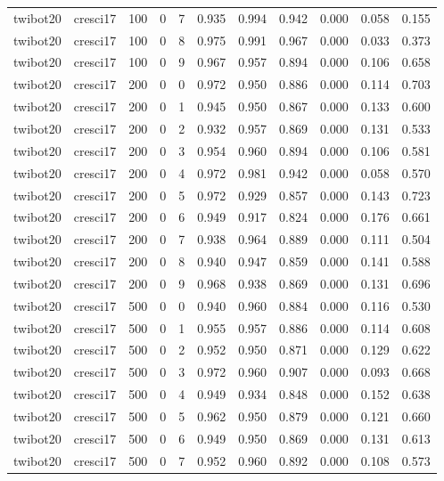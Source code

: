 \begin{tabular}{llrrrrrrrrr}
twibot20 & cresci17 & 100 & 0 & 7 & 0.935 & 0.994 & 0.942 & 0.000 & 0.058 & 0.155 \\
twibot20 & cresci17 & 100 & 0 & 8 & 0.975 & 0.991 & 0.967 & 0.000 & 0.033 & 0.373 \\
twibot20 & cresci17 & 100 & 0 & 9 & 0.967 & 0.957 & 0.894 & 0.000 & 0.106 & 0.658 \\
twibot20 & cresci17 & 200 & 0 & 0 & 0.972 & 0.950 & 0.886 & 0.000 & 0.114 & 0.703 \\
twibot20 & cresci17 & 200 & 0 & 1 & 0.945 & 0.950 & 0.867 & 0.000 & 0.133 & 0.600 \\
twibot20 & cresci17 & 200 & 0 & 2 & 0.932 & 0.957 & 0.869 & 0.000 & 0.131 & 0.533 \\
twibot20 & cresci17 & 200 & 0 & 3 & 0.954 & 0.960 & 0.894 & 0.000 & 0.106 & 0.581 \\
twibot20 & cresci17 & 200 & 0 & 4 & 0.972 & 0.981 & 0.942 & 0.000 & 0.058 & 0.570 \\
twibot20 & cresci17 & 200 & 0 & 5 & 0.972 & 0.929 & 0.857 & 0.000 & 0.143 & 0.723 \\
twibot20 & cresci17 & 200 & 0 & 6 & 0.949 & 0.917 & 0.824 & 0.000 & 0.176 & 0.661 \\
twibot20 & cresci17 & 200 & 0 & 7 & 0.938 & 0.964 & 0.889 & 0.000 & 0.111 & 0.504 \\
twibot20 & cresci17 & 200 & 0 & 8 & 0.940 & 0.947 & 0.859 & 0.000 & 0.141 & 0.588 \\
twibot20 & cresci17 & 200 & 0 & 9 & 0.968 & 0.938 & 0.869 & 0.000 & 0.131 & 0.696 \\
twibot20 & cresci17 & 500 & 0 & 0 & 0.940 & 0.960 & 0.884 & 0.000 & 0.116 & 0.530 \\
twibot20 & cresci17 & 500 & 0 & 1 & 0.955 & 0.957 & 0.886 & 0.000 & 0.114 & 0.608 \\
twibot20 & cresci17 & 500 & 0 & 2 & 0.952 & 0.950 & 0.871 & 0.000 & 0.129 & 0.622 \\
twibot20 & cresci17 & 500 & 0 & 3 & 0.972 & 0.960 & 0.907 & 0.000 & 0.093 & 0.668 \\
twibot20 & cresci17 & 500 & 0 & 4 & 0.949 & 0.934 & 0.848 & 0.000 & 0.152 & 0.638 \\
twibot20 & cresci17 & 500 & 0 & 5 & 0.962 & 0.950 & 0.879 & 0.000 & 0.121 & 0.660 \\
twibot20 & cresci17 & 500 & 0 & 6 & 0.949 & 0.950 & 0.869 & 0.000 & 0.131 & 0.613 \\
twibot20 & cresci17 & 500 & 0 & 7 & 0.952 & 0.960 & 0.892 & 0.000 & 0.108 & 0.573 \\

\end{tabular}
